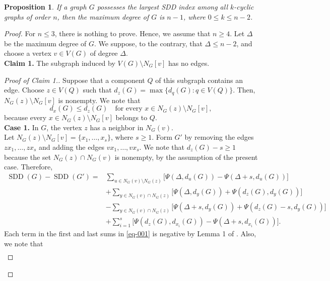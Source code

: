\documentclass[10pt]{article}
\newtheorem{proposition}{Proposition}
\newcommand{\SDD}{\operatorname{SDD}}
\begin{document}
\begin{proposition}\cite{AlbalahiAli2022}\label{thm:main}
If a graph $G$ possesses the largest SDD index
among all $k$-cyclic graphs of order $n$, then the maximum degree of $G$ is $n-1$, where $0\le k\le n-2$.
\end{proposition}

\begin{proof}
For $n\le 3$, there is nothing to prove. Hence, we assume that $n\ge 4$. Let $\Delta$ be the maximum degree of $G$. We suppose, to the contrary, that $\Delta\le n-2$,
and choose a vertex $v\in V(G)$ of degree $\Delta$. \\[2mm]
{\bf Claim 1.}    The
subgraph induced by $V(G)\setminus N_G[v]$ has no edges.



\begin{proof}[Proof of Claim 1.]
    Suppose that a component $Q$ of this subgraph contains an edge. Choose
$z\in V(Q)$ such that $d_z(G)=\max\{d_q(G):q\in V(Q)\}$. Then, $N_G(z)\setminus N_G[v]$ is nonempty. We note that
\begin{equation}\label{eq:Q-maximum}
d_x(G)\le d_z(G)
\quad\text{for every }x\in N_G(z)\setminus N_G[v],
\end{equation}
because every
$x\in N_G(z)\setminus N_G[v]$ belongs to $Q$.\\[2mm]
{\bf Case 1.} In $G$, the vertex $z$ has a neighbor in $N_G(v)$.\\
Let
$N_G(z)\setminus N_G[v]=\{x_1,\ldots,x_s\}$, where $s\ge1$. Form
$G'$ by removing the edges $zx_1,\dots,zx_s$ and adding the edges $vx_1,\dots,vx_s$. We note that
$d_z(G)-s\ge1$ because the set $N_G(z)\cap N_G(v)$ is nonempty, by the
assumption of the present case.
Therefore,
\begin{align}\label{eq-001}
\SDD(G)-\SDD(G')
={}&\sum_{u\in N_G(v)\setminus N_G(z)}
 \bigl[\Psi(\Delta,d_u(G))-\Psi(\Delta+s,d_u(G))\big]\nonumber\\
&+\sum_{y\in N_G(v)\cap N_G(z)}
 \bigl[\Psi(\Delta,d_y(G))+\Psi(d_z(G),d_y(G))\big]\nonumber\\
&-\sum_{y\in N_G(v)\cap N_G(z)}
 \bigl[\Psi(\Delta+s,d_y(G))
       +\Psi(d_z(G)-s,d_y(G))\big]\nonumber\\
&+\sum_{i=1}^{s}
 \bigl[\Psi(d_z(G),d_{x_i}(G))
       -\Psi(\Delta+s,d_{x_i}(G))\big].
\end{align}
Each term in the first and last sums in \eqref{eq-001} is negative by Lemma 1 of \cite{AlbalahiAli2022}. Also, we note that
\begin{align*}

\end{align*}
\end{proof}
\end{proof}
\end{document}
